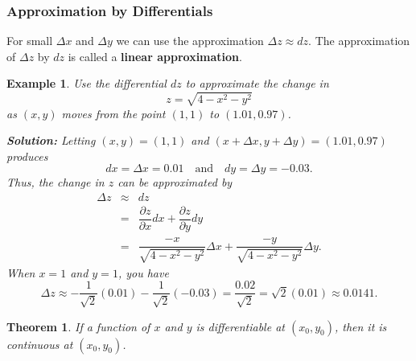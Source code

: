 \documentclass[titlepage,a4paper,12pt]{report}
\newtheorem{example}{Example}[section]
\newtheorem{theorem}{Theorem}[section]
\begin{document}
\subsubsection{Approximation by Differentials }
For small $\Delta x$ and $\Delta y$ we can use the approximation $\Delta z \approx dz$. The approximation of $\Delta z$ by $dz$ is called a \textbf{linear approximation}.
\begin{example}
Use the differential $dz$ to approximate the change in 
\[z=\sqrt{4-x^2-y^2}\] as $(x,y)$ moves from the point $(1,1)$ to $(1.01, 0.97)$.

\noindent \textbf{Solution:} Letting $(x,y)=(1,1)$ and $(x+\Delta x, y+\Delta y)=(1.01, 0.97)$ produces 
\[dx=\Delta x =0.01 \quad \mbox{and} \quad dy=\Delta y =-0.03.\]
Thus, the change in $z$ can be approximated by 
\begin{eqnarray*}
\Delta z &\approx & dz \\
&=& \dfrac{\partial z}{\partial x}dx+\dfrac{\partial z}{\partial y}dy \\
&=& \dfrac{-x}{\sqrt{4-x^2-y^2}}\Delta x + \dfrac{-y}{\sqrt{4-x^2-y^2}}\Delta y.
\end{eqnarray*}
When $x=1$ and $y=1$, you have 
\[\Delta z \approx -\dfrac{1}{\sqrt{2}}(0.01)-\dfrac{1}{\sqrt{2}}(-0.03)=\dfrac{0.02}{\sqrt{2}}=\sqrt{2}(0.01) \approx 0.0141.\]
\end{example}
\begin{theorem}
If a function of $x$ and $y$ is differentiable at $(x_0,y_0)$, then it is continuous at $(x_0,y_0)$.

\end{theorem}
\end{document}
